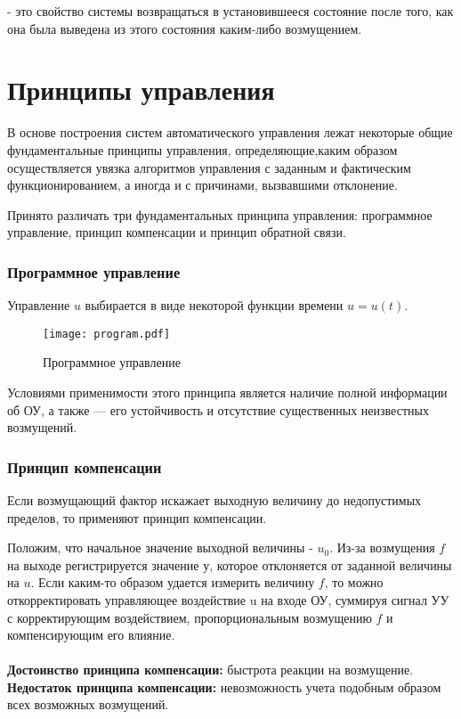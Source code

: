 \documentclass[TAU.tex]{subfiles}
\begin{document}
 - это свойство системы возвращаться в установившееся состояние после того, как она была выведена из этого состояния каким-либо возмущением. 
\section{Принципы управления}
В основе построения систем автоматического управления лежат некоторые общие фундаментальные принципы управления, определяющие,каким образом осуществляется увязка алгоритмов управления с заданным и фактическим функционированием, а иногда и с причинами, вызвавшими отклонение.\par
Принято различать три фундаментальных принципа управления: программное управление, принцип компенсации и принцип обратной связи.

\subsubsection{Программное управление}

Управление $u$ выбирается в виде некоторой функции времени $u = u(t)$.

\begin{figure}[h]
\texttt{[image: program.pdf]}
\caption{Программное управление}
\centering
\end{figure}

Условиями применимости этого принципа является наличие полной информации об ОУ, а также --- его устойчивость и отсутствие существенных неизвестных возмущений.

\subsubsection{Принцип компенсации}
Если возмущающий фактор искажает выходную величину до недопустимых пределов, то применяют принцип компенсации. \par
Положим, что начальное значение выходной величины - $u_0$. Из-за возмущения $f$ на выходе регистрируется значение $у$, которое отклоняется от заданной величины на $u$. 
Если каким-то образом удается измерить величину $f$, то можно откорректировать управляющее воздействие u на входе ОУ, суммируя сигнал УУ с корректирующим воздействием, пропорциональным возмущению $f$ и компенсирующим его влияние.\\\\
{\bf Достоинство принципа компенсации:} быстрота реакции на возмущение. \\
{\bf Недостаток принципа компенсации:} невозможность учета подобным образом всех возможных возмущений.
\end{document}
